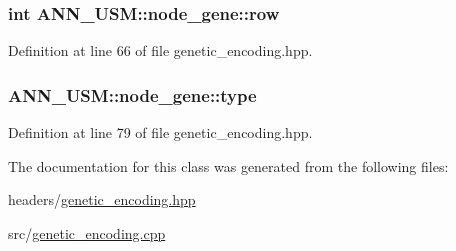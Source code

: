 \hypertarget{class_a_n_n___u_s_m_1_1node__gene_acf1e1356443a2ea954570d9e048ef72c}{
\subsubsection[{row}]{\setlength{\rightskip}{0pt plus 5cm}int A\-N\-N\-\_\-\-U\-S\-M\-::node\-\_\-gene\-::row}}\label{class_a_n_n___u_s_m_1_1node__gene_acf1e1356443a2ea954570d9e048ef72c}


Definition at line 66 of file genetic\-\_\-encoding.\-hpp.

\hypertarget{class_a_n_n___u_s_m_1_1node__gene_abe075ac0849a7b7bb2aca6fac57cea00}{
\subsubsection[{type}]{ A\-N\-N\-\_\-\-U\-S\-M\-::node\-\_\-gene\-::type}}\label{class_a_n_n___u_s_m_1_1node__gene_abe075ac0849a7b7bb2aca6fac57cea00}


Definition at line 79 of file genetic\-\_\-encoding.\-hpp.



The documentation for this class was generated from the following files\-:\begin{DoxyCompactItemize}
\item 
headers/\hyperlink{genetic__encoding_8hpp}{genetic\-\_\-encoding.\-hpp}\item 
src/\hyperlink{genetic__encoding_8cpp}{genetic\-\_\-encoding.\-cpp}\end{DoxyCompactItemize}
